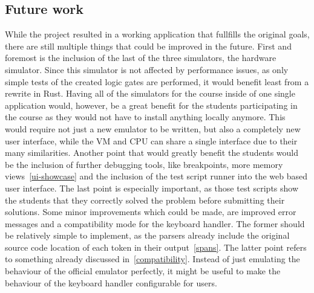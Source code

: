 \subsection{Future work} \label{future-work}
While the project resulted in a working application that fullfills the original goals, there are still multiple things that could be improved in the future.
First and foremost is the inclusion of the last of the three simulators, the hardware simulator. Since this simulator is not affected by performance issues, as only simple tests of the created logic gates are performed, it would benefit least from a rewrite in Rust. Having all of the simulators for the course inside of one single application would, however, be a great benefit for the students participating in the course as they would not have to install anything locally anymore.
This would require not just a new emulator to be written, but also a completely new user interface, while the VM and CPU can share a single interface due to their many similarities.
Another point that would greatly benefit the students would be the inclusion of further debugging tools, like breakpoints, more memory views~\ref{ui-showcase} and the inclusion of the test script runner into the web based user interface.
The last point is especially important, as those test scripts show the students that they correctly solved the problem before submitting their solutions.
Some minor improvements which could be made, are improved error messages and a compatibility mode for the keyboard handler.
The former should be relatively simple to implement, as the parsers already include the original source code location of each token in their output~\ref{spans}.
The latter point refers to something already discussed in~\cref{compatibility}. Instead of just emulating the behaviour of the official emulator perfectly, it might be useful to make the behaviour of the keyboard handler configurable for users.


